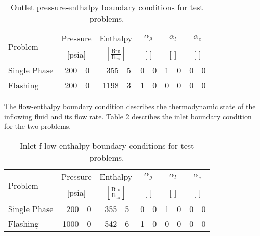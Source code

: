 \begin{table}[ht]
\centering
\begin{tabular}{@{}lr@{.}lr@{.}lr@{.}lr@{.}lr@{.}l@{}} \toprule
\multirow{2}{*}{Problem} & \multicolumn{2}{c}{Pressure} & \multicolumn{2}{c}{Enthalpy}             & \multicolumn{2}{c}{$\alpha_g$} & \multicolumn{2}{c}{$\alpha_l$} & \multicolumn{2}{c}{$\alpha_e$} \\ 
                         & \multicolumn{2}{c}{[psia]} & \multicolumn{2}{c}{$[\frac{\text{Btu}}{\text{lb}_{\text{m}}}]$} & \multicolumn{2}{c}{[-]}      & \multicolumn{2}{c}{[-]}      & \multicolumn{2}{c}{[-]}      \\ \midrule
Single Phase             &  200&0                       &  355&5                                   & 0&0                            & 1&0                            & 0&0 \\
Flashing                 &  200&0                       & 1198&3                                   & 1&0                            & 0&0                            & 0&0 \\ \bottomrule  
\end{tabular}
\caption{Outlet pressure-enthalpy boundary conditions for test problems.}
\label{tab:bc_pe}
\end{table}

The flow-enthalpy boundary condition describes the thermodynamic state of the inflowing fluid and its flow rate.
Table \ref{tab:bc_fe} describes the inlet boundary condition for the two problems.

\begin{table}[ht]
\centering
\begin{tabular}{@{}lr@{.}lr@{.}lr@{.}lr@{.}lr@{.}l@{}} \toprule
\multirow{2}{*}{Problem} & \multicolumn{2}{c}{Pressure} & \multicolumn{2}{c}{Enthalpy}             & \multicolumn{2}{c}{$\alpha_g$} & \multicolumn{2}{c}{$\alpha_l$} & \multicolumn{2}{c}{$\alpha_e$} \\ 
                         & \multicolumn{2}{c}{[psia]} & \multicolumn{2}{c}{$[\frac{\text{Btu}}{\text{lb}_{\text{m}}}]$} & \multicolumn{2}{c}{[-]}      & \multicolumn{2}{c}{[-]}      & \multicolumn{2}{c}{[-]}      \\ \midrule
Single Phase             &  200&0                       &  355&5                                   & 0&0                            & 1&0                            & 0&0 \\
Flashing                 & 1000&0                       &  542&6                                   & 1&0                            & 0&0                            & 0&0 \\ \bottomrule  
\end{tabular}
\caption{Inlet f	low-enthalpy boundary conditions for test problems.}
\label{tab:bc_fe}
\end{table}

